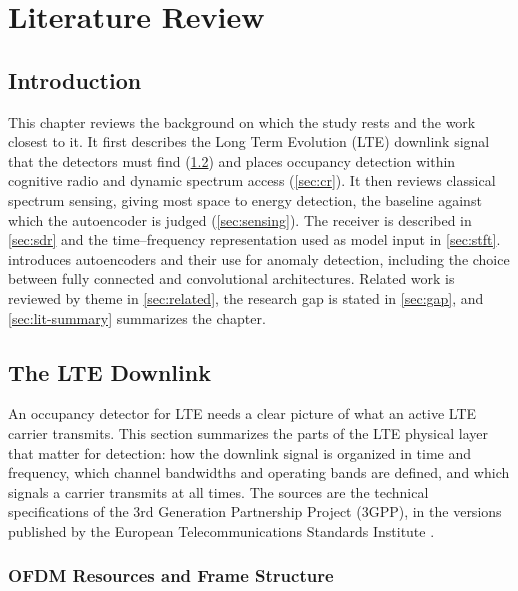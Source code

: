 \chapter{Literature Review}
\label{chap:literature}


\section{Introduction}
\label{sec:lit-intro}

This chapter reviews the background on which the study rests and the work closest to it. It first describes the Long Term Evolution (LTE) downlink signal that the detectors must find (\cref{sec:lte}) and places occupancy detection within cognitive radio and dynamic spectrum access (\cref{sec:cr}). It then reviews classical spectrum sensing, giving most space to energy detection, the baseline against which the autoencoder is judged (\cref{sec:sensing}). The receiver is described in \cref{sec:sdr} and the time--frequency representation used as model input in \cref{sec:stft}.  introduces autoencoders and their use for anomaly detection, including the choice between fully connected and convolutional architectures. Related work is reviewed by theme in \cref{sec:related}, the research gap is stated in \cref{sec:gap}, and \cref{sec:lit-summary} summarizes the chapter.

\section{The LTE Downlink}
\label{sec:lte}

An occupancy detector for LTE needs a clear picture of what an active LTE carrier transmits. This section summarizes the parts of the LTE physical layer that matter for detection: how the downlink signal is organized in time and frequency, which channel bandwidths and operating bands are defined, and which signals a carrier transmits at all times. The sources are the technical specifications of the 3rd Generation Partnership Project (3GPP), in the versions published by the European Telecommunications Standards Institute \parencite{3gpp2026a,3gpp2026b}.

\subsection{OFDM Resources and Frame Structure}
\label{sec:lte-frame}

